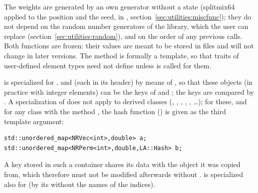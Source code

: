 The weights are generated by an own generator without a state (splitmix64 applied to the position and the seed,
 in , section~\ref{sec:utilities:miscfunc}); they do not depend on the random number generators of the library, which
the user can replace (section~\ref{sec:utilities:random}), and on the order of any previous calls. Both functions are
frozen: their values are meant to be stored in files and will not change in later versions. The method
 is formally a template, so that traits of user-defined element types need not define
 unless  is called for them.

 is specialized for ,  and  (each in its header) by means
of , so that these objects (in practice with integer elements) can be the keys of
 and ; the keys are compared by . A specialization
of  does not apply to derived classes (, , ,
, , \dots); for these, and for any class with the method , the
hash function  () is given as the third template argument:
\begin{lstlisting}
std::unordered_map<NRVec<int>,double> a;
std::unordered_map<NRPerm<int>,double,LA::Hash> b;
\end{lstlisting}
A key stored in such a container shares its data with the object it was copied from, which therefore must not be
modified afterwards without .  is specialized also for  (by its
 without the names of the indices).

